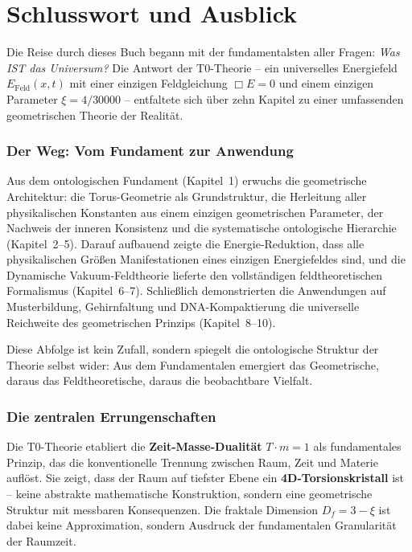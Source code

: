 \documentclass[11pt,oneside]{book}
\begin{document}
\backmatter

\chapter*{Schlusswort und Ausblick}

Die Reise durch dieses Buch begann mit der fundamentalsten aller Fragen: \textit{Was IST das Universum?} Die Antwort der T0-Theorie -- ein universelles Energiefeld $E_{\text{Feld}}(x,t)$ mit einer einzigen Feldgleichung $\Box E = 0$ und einem einzigen Parameter $\xi = 4/30000$ -- entfaltete sich über zehn Kapitel zu einer umfassenden geometrischen Theorie der Realität.

\subsection*{Der Weg: Vom Fundament zur Anwendung}

Aus dem ontologischen Fundament (Kapitel~1) erwuchs die geometrische Architektur: die Torus-Geometrie als Grundstruktur, die Herleitung aller physikalischen Konstanten aus einem einzigen geometrischen Parameter, der Nachweis der inneren Konsistenz und die systematische ontologische Hierarchie (Kapitel~2--5). Darauf aufbauend zeigte die Energie-Reduktion, dass alle physikalischen Größen Manifestationen eines einzigen Energiefeldes sind, und die Dynamische Vakuum-Feldtheorie lieferte den vollständigen feldtheoretischen Formalismus (Kapitel~6--7). Schließlich demonstrierten die Anwendungen auf Musterbildung, Gehirnfaltung und DNA-Kompaktierung die universelle Reichweite des geometrischen Prinzips (Kapitel~8--10).

Diese Abfolge ist kein Zufall, sondern spiegelt die ontologische Struktur der Theorie selbst wider: Aus dem Fundamentalen emergiert das Geometrische, daraus das Feldtheoretische, daraus die beobachtbare Vielfalt.

\subsection*{Die zentralen Errungenschaften}

Die T0-Theorie etabliert die \textbf{Zeit-Masse-Dualität} $T \cdot m = 1$ als fundamentales Prinzip, das die konventionelle Trennung zwischen Raum, Zeit und Materie auflöst. Sie zeigt, dass der Raum auf tiefster Ebene ein \textbf{4D-Torsionskristall} ist -- keine abstrakte mathematische Konstruktion, sondern eine geometrische Struktur mit messbaren Konsequenzen. Die fraktale Dimension $D_f = 3 - \xi$ ist dabei keine Approximation, sondern Ausdruck der fundamentalen Granularität der Raumzeit.
\end{document}
